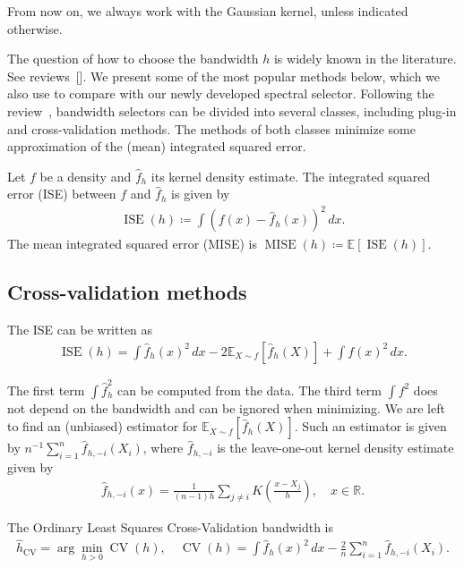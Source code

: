 From now on, we always work with the Gaussian kernel, unless indicated otherwise.

The question of how to choose the bandwidth $h$ is widely known in the literature. See reviews~[]. We present some of the most popular methods below, which we also use to compare with our newly developed spectral selector. Following the review~\cite{heidenreich_bandwidth_2013}, bandwidth selectors can be divided into several classes, including plug-in and cross-validation methods. The methods of both classes minimize some approximation of the (mean) integrated squared error.

\begin{Def}
    Let $f$ be a density and $\hat{f}_h$ its kernel density estimate. The integrated squared error (ISE) between $f$ and $\hat{f}_h$ is given by
    \begin{align*}
        \operatorname{ISE}(h)\coloneqq \int\left(f(x)-\hat{f}_h(x)\right)^2\,dx.
    \end{align*}
    The mean integrated squared error (MISE) is $\operatorname{MISE}(h)\coloneqq\mathbb{E}[\operatorname{ISE}(h)]$.
\end{Def}

\subsection*{Cross-validation methods}

The ISE can be written as
\begin{align*}
    \operatorname{ISE}(h)=\int\hat{f}_h(x)^2\,dx-2\mathbb{E}_{X\sim f}\left[\hat{f}_h(X)\right]+\int f(x)^2\,dx.
\end{align*}

The first term $\int\hat{f}_h^2$ can be computed from the data. The third term $\int f^2$ does not depend on the bandwidth and can be ignored when minimizing. We are left to find an (unbiased) estimator for $\mathbb{E}_{X\sim f}[\hat{f}_h(X)]$. Such an estimator is given by $n^{-1}\sum_{i=1}^{n}\hat{f}_{h,-i}(X_i)$, where $\hat{f}_{h,-i}$ is the leave-one-out kernel density estimate given by
\begin{align*}
    \hat{f}_{h,-i}(x)=\frac{1}{(n-1)h}\sum_{j\ne i}K\left(\frac{x-X_j}{h}\right),\quad x\in\mathbb{R}.
\end{align*}

The Ordinary Least Squares Cross-Validation bandwidth is
\begin{align*}
    \hat{h}_{\operatorname{CV}}=\arg\min_{h>0}\operatorname{CV}(h),\quad\operatorname{CV}(h)=\int\hat{f}_h(x)^2\,dx-\frac{2}{n}\sum_{i=1}^{n}\hat{f}_{h,-i}(X_i).
\end{align*}

